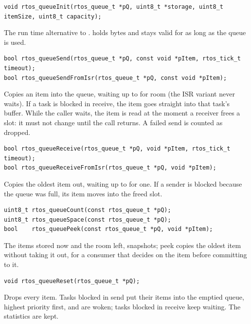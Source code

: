 \begin{lstlisting}
void rtos_queueInit(rtos_queue_t *pQ, uint8_t *storage, uint8_t itemSize, uint8_t capacity);
\end{lstlisting}
The run time alternative to .  holds
 bytes and stays valid for as long as the queue is used.

\begin{lstlisting}
bool rtos_queueSend(rtos_queue_t *pQ, const void *pItem, rtos_tick_t timeout);
bool rtos_queueSendFromIsr(rtos_queue_t *pQ, const void *pItem);
\end{lstlisting}
Copies an item into the queue, waiting up to  for room (the ISR variant
never waits). If a task is blocked in receive, the item goes straight into that task's
buffer. While the caller waits, the item is read at the moment a receiver frees a slot:
it must not change until the call returns. A failed send is counted as dropped.

\begin{lstlisting}
bool rtos_queueReceive(rtos_queue_t *pQ, void *pItem, rtos_tick_t timeout);
bool rtos_queueReceiveFromIsr(rtos_queue_t *pQ, void *pItem);
\end{lstlisting}
Copies the oldest item out, waiting up to  for one. If a sender is blocked
because the queue was full, its item moves into the freed slot.

\begin{lstlisting}
uint8_t rtos_queueCount(const rtos_queue_t *pQ);
uint8_t rtos_queueSpace(const rtos_queue_t *pQ);
bool    rtos_queuePeek(const rtos_queue_t *pQ, void *pItem);
\end{lstlisting}
The items stored now and the room left, snapshots; peek copies the oldest item without
taking it out, for a consumer that decides on the item before committing to it.

\begin{lstlisting}
void rtos_queueReset(rtos_queue_t *pQ);
\end{lstlisting}
Drops every item. Tasks blocked in send put their items into the emptied queue, highest
priority first, and are woken; tasks blocked in receive keep waiting. The statistics are
kept.

